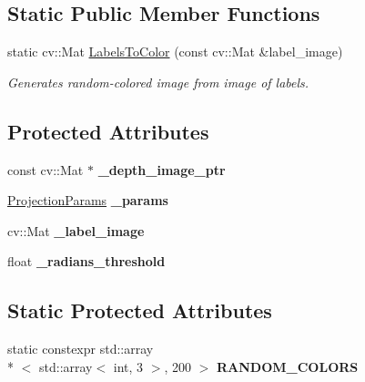 \subsection*{Static Public Member Functions}
\begin{DoxyCompactItemize}
\item 
static cv\-::\-Mat \hyperlink{classdepth__clustering_1_1AbstractImageLabeler_abab18e0c1ca40b54922a2f21948b996b}{Labels\-To\-Color} (const cv\-::\-Mat \&label\-\_\-image)
\begin{DoxyCompactList}\small\item\em Generates random-\/colored image from image of labels. \end{DoxyCompactList}\end{DoxyCompactItemize}
\subsection*{Protected Attributes}
\begin{DoxyCompactItemize}
\item 
\hypertarget{classdepth__clustering_1_1AbstractImageLabeler_adb50d2beeba4e4eac26b5ace9304728b}{const cv\-::\-Mat $\ast$ {\bfseries \-\_\-depth\-\_\-image\-\_\-ptr}}\label{classdepth__clustering_1_1AbstractImageLabeler_adb50d2beeba4e4eac26b5ace9304728b}

\item 
\hypertarget{classdepth__clustering_1_1AbstractImageLabeler_a25fcaead9f8806fa75ad44c669e2a518}{\hyperlink{classdepth__clustering_1_1ProjectionParams}{Projection\-Params} {\bfseries \-\_\-params}}\label{classdepth__clustering_1_1AbstractImageLabeler_a25fcaead9f8806fa75ad44c669e2a518}

\item 
\hypertarget{classdepth__clustering_1_1AbstractImageLabeler_aeabb8ac8238c684066f8c0edcca9b807}{cv\-::\-Mat {\bfseries \-\_\-label\-\_\-image}}\label{classdepth__clustering_1_1AbstractImageLabeler_aeabb8ac8238c684066f8c0edcca9b807}

\item 
\hypertarget{classdepth__clustering_1_1AbstractImageLabeler_a1a338d254a41ba94bd4122aa006fbe57}{float {\bfseries \-\_\-radians\-\_\-threshold}}\label{classdepth__clustering_1_1AbstractImageLabeler_a1a338d254a41ba94bd4122aa006fbe57}

\end{DoxyCompactItemize}
\subsection*{Static Protected Attributes}
\begin{DoxyCompactItemize}
\item 
\hypertarget{classdepth__clustering_1_1AbstractImageLabeler_a24ea9d1c40b872189a9e93f369ae34b2}{static constexpr std\-::array\\*
$<$ std\-::array$<$ int, 3 $>$, 200 $>$ {\bfseries R\-A\-N\-D\-O\-M\-\_\-\-C\-O\-L\-O\-R\-S}}\label{classdepth__clustering_1_1AbstractImageLabeler_a24ea9d1c40b872189a9e93f369ae34b2}

\end{DoxyCompactItemize}


